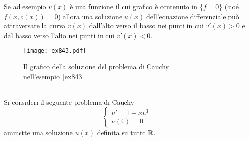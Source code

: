 Se ad esempio $v(x)$ è una funzione
il cui grafico è contenuto in $\{f=0\}$
(cioé $f(x,v(x))=0$) allora una soluzione $u(x)$ dell'equazione
differenziale può attraversare la curva $v(x)$ dall'alto verso il
basso nei punti in cui $v'(x)>0$ e dal basso verso l'alto nei punti
in cui $v'(x)<0$.

\newsavebox{\qrexoqt}
\begin{figure}
\centering
\texttt{[image: ex843.pdf]}
\caption{Il grafico della soluzione del problema di Cauchy nell'esempio~\ref{ex843}
\ifwidemargin\\\\\fi%
\usebox{\qrexoqt}}
\label{fig:ex843}
\end{figure}
%
\begin{example}\label{ex843}
Si consideri il seguente problema di Cauchy
\[
\begin{cases}
  u'=1-x u^3\\
  u(0)=0
\end{cases}
\]
ammette una soluzione $u(x)$ definita su tutto ${\mathbb R}$.
\end{example}
%
